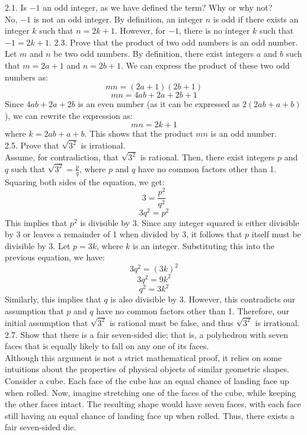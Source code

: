 \documentclass{article}
\begin{document}
\newpage

2.1. Is $-1$ an odd integer, as we have defined the term? Why or why not?
\\[2\baselineskip]No, $-1$ is not an odd integer. By definition, an integer $n$ is odd if there exists an integer $k$ such that $n = 2k + 1$. However, for $-1$, there is no integer $k$ such that $-1 = 2k + 1$.
2.3. Prove that the product of two odd numbers is an odd number.
\\[2\baselineskip]Let $m$ and $n$ be two odd numbers. By definition, there exist integers $a$ and $b$ such that $m = 2a + 1$ and $n = 2b + 1$. We can express the product of these two odd numbers as:
\[mn = (2a + 1)(2b + 1)\] \[mn = 4ab + 2a + 2b + 1\]
Since $4ab + 2a + 2b$ is an even number (as it can be expressed as $2(2ab + a + b)$), we can rewrite the expression as:
\[mn = 2k + 1\]
where $k = 2ab + a + b$. This shows that the product $mn$ is an odd number.
\\[2\baselineskip]2.5. Prove that $\sqrt{3^2}$ is irrational.
\\[2\baselineskip]Assume, for contradiction, that $\sqrt{3^2}$ is rational. Then, there exist integers $p$ and $q$ such that $\sqrt{3^2} = \frac{p}{q}$, where $p$ and $q$ have no common factors other than 1. Squaring both sides of the equation, we get:
\[3 = \frac{p^2}{q^2}\] \[3q^2 = p^2\]
This implies that $p^2$ is divisible by 3. Since any integer squared is either divisible by 3 or leaves a remainder of 1 when divided by 3, it follows that $p$ itself must be divisible by 3. Let $p = 3k$, where $k$ is an integer. Substituting this into the previous equation, we have:
\[3q^2 = (3k)^2\]
\[3q^2 = 9k^2\]
\[q^2 = 3k^2\]
Similarly, this implies that $q$ is also divisible by 3. However, this contradicts our assumption that $p$ and $q$ have no common factors other than 1. Therefore, our initial assumption that $\sqrt{3^2}$ is rational must be false, and thus $\sqrt{3^2}$ is irrational.
\\[2\baselineskip]2.7. Show that there is a fair seven-sided die; that is, a polyhedron with seven faces that is equally likely to fall on any one of its faces.
\\[2\baselineskip]Although this argument is not a strict mathematical proof, it relies on some intuitions about the properties of physical objects of similar geometric shapes. Consider a cube. Each face of the cube has an equal chance of landing face up when rolled. Now, imagine stretching one of the faces of the cube, while keeping the other faces intact. The resulting shape would have seven faces, with each face still having an equal chance of landing face up when rolled. Thus, there exists a fair seven-sided die.
\end{document}
